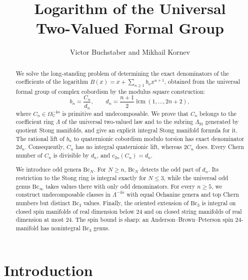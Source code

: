 \documentclass[14pt,dvipsnames]{extarticle}
\title{\bfseries Logarithm of the Universal\\ Two-Valued Formal Group}
\author{Victor Buchstaber and Mikhail Kornev}
\date{}
\numberwithin{equation}{subsection}
\theoremstyle{plain}
\theoremstyle{definition}
\theoremstyle{definition}
\begin{document}
\maketitle

\begin{abstract}
We solve the long-standing problem of determining the exact denominators of the coefficients of the logarithm $B(x)=x+\sum_{n\geq1}b_nx^{n+1}$, obtained from the universal formal group of complex cobordism by the modulus square construction:
$$
b_n=\frac{C_n}{d_n},\qquad
d_n=\frac{n+1}{2}\operatorname{lcm}(1,\ldots,2n+2),
$$
where $C_n\in\Omega_{\mathrm U}^{-4n}$ is primitive and undecomposable. We prove that $C_n$ belongs to the coefficient ring $\Lambda$ of the universal two-valued law and to the subring $\Lambda_{\mathrm{St}}$ generated by quotient Stong manifolds, and give an explicit integral Stong manifold formula for it. The rational lift of $b_n$ to quaternionic cobordism modulo torsion has exact denominator $2d_n$. Consequently, $C_n$ has no integral quaternionic lift, whereas $2C_n$ does. Every Chern number of $C_n$ is divisible by $d_n$, and $c_{2n}(C_n)=d_n$.

We introduce odd genera $\mathrm{Bc}_N$. For $N\geq n$, $\mathrm{Bc}_N$ detects the odd part of $d_n$. Its restriction to the Stong ring is integral exactly for $N\leq3$, while the universal odd genus $\mathrm{Bc}_{\infty}$ takes values there with only odd denominators. For every $n\geq5$, we construct undecomposable classes in $\Lambda^{-4n}$ with equal Ochanine genera and top Chern numbers but distinct $\mathrm{Bc}_3$ values. Finally, the oriented extension of $\mathrm{Bc}_3$ is integral on closed spin manifolds of real dimension below $24$ and on closed string manifolds of real dimension at most $24$. The spin bound is sharp: an Anderson--Brown--Peterson spin $24$-manifold has nonintegral $\mathrm{Bc}_3$ genus.
\end{abstract}

\thispagestyle{empty}

\newpage

\begin{center}
\end{center}


\setcounter{tocdepth}{2}
\tableofcontents
\thispagestyle{empty}
\newpage

\section{Introduction}
\end{document}
